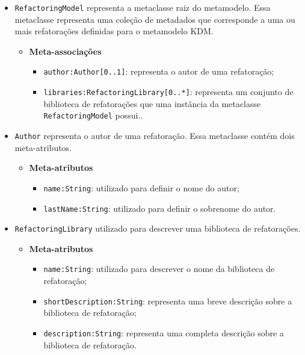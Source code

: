 \begin{itemize}
\item \texttt{RefactoringModel} representa a metaclasse raiz do metamodelo. Essa metaclasse representa uma coleção de metadados que corresponde a uma ou mais refatorações definidas para o metamodelo KDM.

\begin{itemize}
	\item \textbf{Meta-associações}
		\begin{itemize}
			\item \texttt{author:Author[0..1]}: representa o autor de uma refatoração; 
			\item \texttt{libraries:RefactoringLibrary[0..*]}: representa um conjunto de biblioteca de refatorações que uma instância da metaclasse \texttt{RefactoringModel} possui..
		\end{itemize}
\end{itemize}

\item \texttt{Author} representa o autor de uma refatoração. Essa metaclasse contém dois meta-atributos.

\begin{itemize}
	\item \textbf{Meta-atributos}
		\begin{itemize}
			\item \texttt{name:String}: utilizado para definir o nome do autor;
			\item \texttt{lastName:String}: utilizado para definir o sobrenome do autor.
		\end{itemize}	
\end{itemize} 

\item \texttt{RefactoringLibrary} utilizado para descrever uma biblioteca de refatorações.

\begin{itemize}
	\item \textbf{Meta-atributos}
		\begin{itemize}
			\item \texttt{name:String}: utilizado para descrever o nome da biblioteca de refatoração;
			\item \texttt{shortDescription:String}: representa uma breve descrição sobre a biblioteca de refatoração;
			\item \texttt{description:String}: representa uma completa descrição sobre a biblioteca de refatoração.
		\end{itemize}	
\end{itemize} 


\end{itemize}
